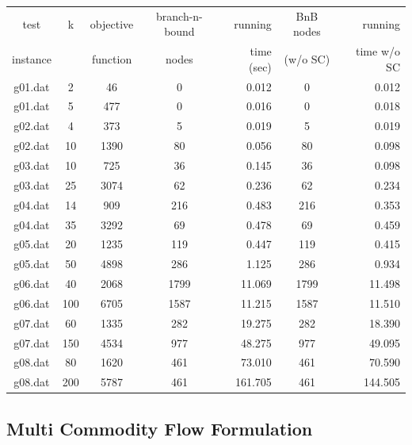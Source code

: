 \documentclass[,%
			paper=a4,%
			DIV14,
			liststotoc,
			bibtotoc,
			draft=false,%
			numbers=noendperiod
			]{scrartcl}
\begin{document}
\begin{tabular}{||c||cccr|cr||}

\hline
test     & k & objective  & branch-n-bound & running   & BnB nodes & running\\
instance &   & function   & nodes          & time (sec)& (w/o SC)  & time w/o SC \\
\hline

g01.dat	&	2	&	46	&	0	&	0.012	&	0	&	0.012	\\
g01.dat	&	5	&	477	&	0	&	0.016	&	0	&	0.018	\\
g02.dat	&	4	&	373	&	5	&	0.019	&	5	&	0.019	\\
g02.dat	&	10	&	1390	&	80	&	0.056	&	80	&	0.098	\\
g03.dat	&	10	&	725	&	36	&	0.145	&	36	&	0.098	\\
g03.dat	&	25	&	3074	&	62	&	0.236	&	62	&	0.234	\\
g04.dat	&	14	&	909	&	216	&	0.483	&	216	&	0.353	\\
g04.dat	&	35	&	3292	&	69	&	0.478	&	69	&	0.459	\\
g05.dat	&	20	&	1235	&	119	&	0.447	&	119	&	0.415	\\
g05.dat	&	50	&	4898	&	286	&	1.125	&	286	&	0.934	\\
g06.dat	&	40	&	2068	&	1799	&	11.069	&	1799	&	11.498	\\
g06.dat	&	100	&	6705	&	1587	&	11.215	&	1587	&	11.510	\\
g07.dat	&	60	&	1335	&	282	&	19.275	&	282	&	18.390	\\
g07.dat	&	150	&	4534	&	977	&	48.275	&	977	&	49.095	\\
g08.dat	&	80	&	1620	&	461	&	73.010	&	461	&	70.590	\\
g08.dat	&	200	&	5787	&	461	&	161.705	&	461	&	144.505	\\

\hline

\end{tabular}

\subsection{Multi Commodity Flow Formulation}
\end{document}
